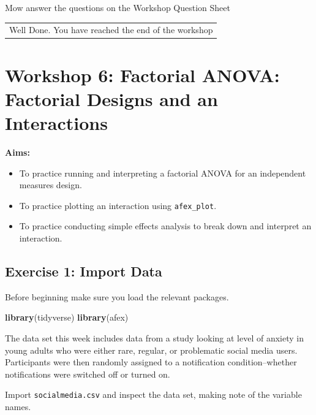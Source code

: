 \documentclass[
]{book}
\newenvironment{Shaded}{\begin{snugshade}}{\end{snugshade}}
\newcommand{\FunctionTok}[1]{\textcolor[rgb]{0.13,0.29,0.53}{\textbf{#1}}}
\newcommand{\NormalTok}[1]{#1}
\providecommand{\tightlist}{%
  \setlength{\itemsep}{0pt}\setlength{\parskip}{0pt}}
\let\oldsection\section
\renewcommand{\section}{\needspace{5\baselineskip}\oldsection}
\begin{document}
Mow answer the questions on the Workshop Question Sheet

\begin{longtable}[]{@{}l@{}}
\toprule\noalign{}
\endhead
\bottomrule\noalign{}
\endlastfoot
Well Done. You have reached the end of the workshop \\
\end{longtable}

\chapter{Workshop 6: Factorial ANOVA: Factorial Designs and an Interactions}\label{workshop-6-factorial-anova-factorial-designs-and-an-interactions}

\textbf{Aims:}

\begin{itemize}
\tightlist
\item
  To practice running and interpreting a factorial ANOVA for an independent measures design.
\item
  To practice plotting an interaction using \texttt{afex\_plot}.
\item
  To practice conducting simple effects analysis to break down and interpret an interaction.
\end{itemize}

\section{Exercise 1: Import Data}\label{exercise-1-import-data}

Before beginning make sure you load the relevant packages.

\begin{Shaded}
\begin{Highlighting}[]
\FunctionTok{library}\NormalTok{(tidyverse)}
\FunctionTok{library}\NormalTok{(afex)}
\end{Highlighting}
\end{Shaded}

The data set this week includes data from a study looking at level of anxiety in young adults who were either rare, regular, or problematic social media users. Participants were then randomly assigned to a notification condition--whether notifications were switched off or turned on.

Import \texttt{socialmedia.csv} and inspect the data set, making note of the variable names.
\end{document}
